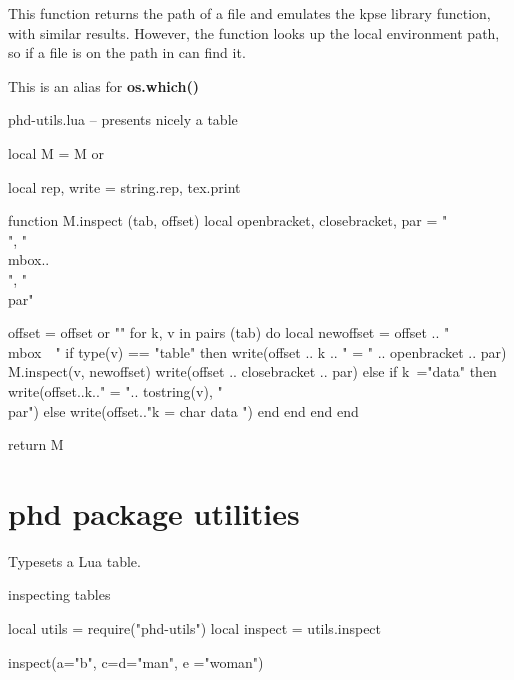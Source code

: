  
  This function returns the path of a file and emulates the kpse library function, with similar results. However, the function looks up the local environment path, so if a file is on the path in can find it.

 This is an alias for \textbf{os.which()}

\begin{filecontents*}{phd-utils.lua}
-- presents nicely a table 

local M = M or {}

local rep, write = string.rep, tex.print

function M.inspect (tab, offset)
   local openbracket, closebracket, par = "\\{", "\\mbox{..}\\}", "\\par"
   
    offset = offset or ""
    for k, v in pairs (tab) do
        local newoffset = offset .. "\\mbox{~~}"
        if type(v) == "table" then
           write(offset .. k .. " = " .. openbracket .. par)
           M.inspect(v, newoffset)
           write(offset .. closebracket .. par)
        else
         if k~="data" then write(offset..k.." =  ".. tostring(v), "\\par") 
           else
                 write(offset.."k = char data ")
           end
       end
    end
end

return M
\end{filecontents*}

\section{phd package utilities}

 Typesets a Lua table. 

\begin{texexample}{inspecting tables}{}
\begin{luacode}
local utils = require("phd-utils")
local inspect = utils.inspect

inspect({a="b", c={d="man", e ="woman"}})
\end{luacode}
\end{texexample}


